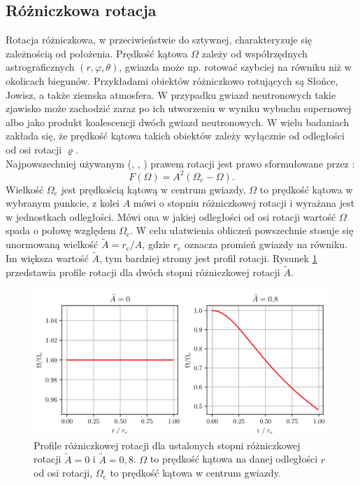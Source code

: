 \documentclass{bachelor_thesis}
\begin{document}
        \subsection{Różniczkowa rotacja}
        Rotacja różniczkowa, w przeciwieństwie do sztywnej, charakteryzuje się zależnością od położenia. Prędkość kątowa $\Omega$ zależy od współrzędnych astrograficznych $(r,\varphi,\theta)$, gwiazda może np. rotować szybciej na równiku niż w okolicach biegunów. Przykładami obiektów różniczkowo rotujących są Słońce, Jowisz, a także ziemska atmosfera. W przypadku gwiazd neutronowych takie zjawisko może zachodzić zaraz po ich utworzeniu w wyniku wybuchu supernowej albo jako produkt koalescencji dwóch gwiazd neutronowych. W wielu badaniach zakłada się, że prędkość kątowa takich obiektów zależy wyłącznie od odległości od osi rotacji $\varrho$.\\ \indent Najpowszechniej używanym (\citealp{Baumgarte2000}, \citealp{Lyford2003}, \citealp{Ansorg2009}) prawem rotacji jest prawo sformułowane przez \cite{Komatsu1989}:
        \begin{equation}
            F(\Omega)=A^2(\Omega_\textrm{c}-\Omega).
            \label{EqKomatsu}
        \end{equation}
        Wielkość $\Omega_\textrm{c}$ jest prędkością kątową w centrum gwiazdy, $\Omega$ to prędkość kątowa w wybranym punkcie, z kolei $A$ mówi o stopniu różniczkowej rotacji i wyrażana jest w jednostkach odległości. Mówi ona w jakiej odległości od osi rotacji wartość $\Omega$ spada o połowę względem $\Omega_\textrm{c}$. W celu ułatwienia obliczeń powszechnie stosuje się unormowaną wielkość $\tilde{A}=r_e/A$, gdzie $r_e$ oznacza promień gwiazdy na równiku. Im większa wartość $\tilde{A}$, tym bardziej stromy jest profil rotacji. Rysunek \ref{RysKomatsu} przedstawia profile rotacji dla dwóch stopni różniczkowej rotacji $\tilde{A}$.
       \begin{figure}[h!]
            \centering
            \includegraphics[scale=.3]{figures/RysKom.png}
            \caption{Profile różniczkowej rotacji dla ustalonych stopni różniczkowej rotacji $\tilde{A}=0$ i $\tilde{A}=0,8$. $\Omega$ to prędkość kątowa na danej odległości $r$ od osi rotacji,  $\Omega_\textrm{c}$ to prędkość kątowa w centrum gwiazdy.}
            \label{RysKomatsu}
        \end{figure}\\
\end{document}
